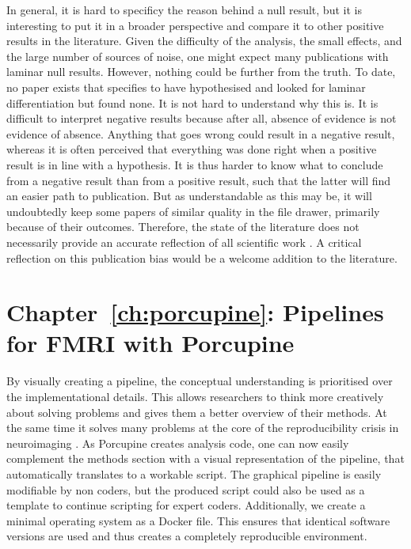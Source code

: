 In general, it is hard to specificy the reason behind a null result, but it is interesting to put it in a broader perspective and compare it to other positive results in the literature. Given the difficulty of the analysis, the small effects, and the large number of sources of noise, one might expect many publications with laminar null results. However, nothing could be further from the truth. To date, no paper exists that specifies to have hypothesised and looked for laminar differentiation but found none. 
It is not hard to understand why this is. It is difficult to interpret negative results because after all, absence of evidence is not evidence of absence. Anything that goes wrong could result in a negative result, whereas it is often perceived that everything was done right when a positive result is in line with a hypothesis. It is thus harder to know what to conclude from a negative result than from a positive result, such that the latter will find an easier path to publication. But as understandable as this may be, it will undoubtedly keep some papers of similar quality in the file drawer, primarily because of their outcomes. Therefore, the state of the literature does not necessarily provide an accurate reflection of all scientific work \cite{Ioannidis2005,Button2013}. A critical reflection on this publication bias would be a welcome addition to the literature.

\section*{Chapter~\ref{ch:porcupine}: Pipelines for FMRI with Porcupine}
By visually creating a pipeline, the conceptual understanding is prioritised over the implementational details. This allows researchers to think more creatively about solving problems and gives them a better overview of their methods. At the same time it solves many problems at the core of the reproducibility crisis in neuroimaging \cite{Nature2017,...}. As Porcupine creates analysis code, one can now easily complement the methods section with a visual representation of the pipeline, that automatically translates to a workable script. The graphical pipeline is easily modifiable by non coders, but the produced script could also be used as a template to continue scripting for expert coders. Additionally, we create a minimal operating system as a Docker file. This ensures that identical software versions are used and thus creates a completely reproducible environment.

